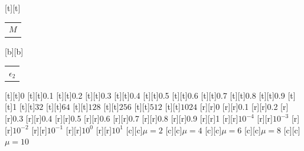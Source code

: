 %    
%
%
\begin{psfrags}%
\psfragscanon%
%
[t][t]{\color[rgb]{0,0,0}\setlength{\tabcolsep}{0pt}\begin{tabular}{c}$M$\end{tabular}}%
[b][b]{\color[rgb]{0,0,0}\setlength{\tabcolsep}{0pt}\begin{tabular}{c}$\epsilon_2$\end{tabular}}%
%
[t][t]{0}%
[t][t]{0.1}%
[t][t]{0.2}%
[t][t]{0.3}%
[t][t]{0.4}%
[t][t]{0.5}%
[t][t]{0.6}%
[t][t]{0.7}%
[t][t]{0.8}%
[t][t]{0.9}%
[t][t]{1}%
[t][t]{${32}$}%
[t][t]{${64}$}%
[t][t]{${128}$}%
[t][t]{${256}$}%
[t][t]{${512}$}%
[t][t]{${1024}$}%
%
[r][r]{0}%
[r][r]{0.1}%
[r][r]{0.2}%
[r][r]{0.3}%
[r][r]{0.4}%
[r][r]{0.5}%
[r][r]{0.6}%
[r][r]{0.7}%
[r][r]{0.8}%
[r][r]{0.9}%
[r][r]{1}%
[r][r]{$10^{-4}$}%
[r][r]{$10^{-3}$}%
[r][r]{$10^{-2}$}%
[r][r]{$10^{-1}$}%
[r][r]{$10^{0}$}%
[r][r]{$10^{1}$}%
[c][c]{$\scriptstyle\mu=2$}%
[c][c]{$\scriptstyle\mu=4$}%
[c][c]{$\scriptstyle\mu=6$}%
[c][c]{$\scriptstyle\mu=8$}%
[c][c]{$\scriptstyle\mu=10$}%
%
%
\end{psfrags}%
%
